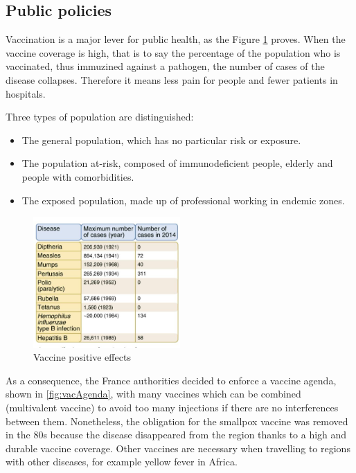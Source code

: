\documentclass{article}
\begin{document}

        \subsection{Public policies}
 
            Vaccination is a major lever for public health, as the Figure \ref{fig:numberofcases} proves.
            When the vaccine coverage is high, that is to say the percentage of the population who is vaccinated, thus immuzined against a pathogen, 
                the number of cases of the disease collapses.
            Therefore it means less pain for people and fewer patients in hospitals.

            Three types of population are distinguished:
            \begin{itemize}
                \item The general population, which has no particular risk or exposure.
                \item The population at-risk, composed of immunodeficient people, elderly and people with comorbidities.
                \item The exposed population, made up of professional working in endemic zones.
            \end{itemize}          

            \begin{figure}
                \centering
                \includegraphics[width=0.5\textwidth]{imgs/NumberOfCases.JPG}
                \caption{Vaccine positive effects \autocite{HowManyLives2021}} %
                \label{fig:numberofcases}
            \end{figure}

            As a consequence, the France authorities decided to enforce a vaccine agenda, shown in \ref{fig:vacAgenda}, with many vaccines
                which can be combined (multivalent vaccine) to avoid too many injections if there are no interferences between them.
            Nonetheless, the obligation for the smallpox vaccine was removed in the 80s because the disease disappeared from the region
                thanks to a high and durable vaccine coverage.
            Other vaccines are necessary when travelling to regions with other diseases, for example yellow fever in Africa.
\end{document}
